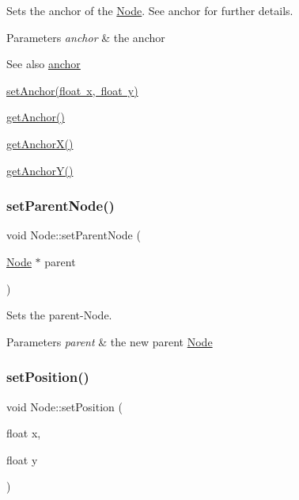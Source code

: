 Sets the anchor of the \mbox{\hyperlink{classsage_1_1Node}{Node}}. See anchor for further details. 


\begin{DoxyParams}{Parameters}
{\em anchor} & the anchor \\
\hline
\end{DoxyParams}
\begin{DoxySeeAlso}{See also}
\mbox{\hyperlink{classsage_1_1Node_a0956f07efec6dcbd3cf796a9028b9175}{anchor}} 

\mbox{\hyperlink{classsage_1_1Node_a8813a645a74f6ab59b25d434e65035c6}{set\+Anchor(float x, float y)}} 

\mbox{\hyperlink{classsage_1_1Node_a6733949b7b281d78a8bef8beafe1b630}{get\+Anchor()}} 

\mbox{\hyperlink{classsage_1_1Node_aa5f31c33d60b32b618d3beaf4e5c6c51}{get\+Anchor\+X()}} 

\mbox{\hyperlink{classsage_1_1Node_a78c5f86d0081854603178fb52d8c0a9b}{get\+Anchor\+Y()}} 
\end{DoxySeeAlso}
\mbox{\label{classsage_1_1Node_ad916f8953f6b38ef3514a37f75f9c20d}} 
\subsubsection{\texorpdfstring{setParentNode()}{setParentNode()}}
{\footnotesize\ttfamily void Node\+::set\+Parent\+Node (\begin{DoxyParamCaption}\item[{\mbox{\hyperlink{classsage_1_1Node}{Node}} $\ast$}]{parent }\end{DoxyParamCaption})\hspace{0.3cm}{\ttfamily [protected]}}



Sets the parent-\/\+Node. 


\begin{DoxyParams}{Parameters}
{\em parent} & the new parent \mbox{\hyperlink{classsage_1_1Node}{Node}} \\
\hline
\end{DoxyParams}
\mbox{\label{classsage_1_1Node_aaa8545c103ef1b35e5076dbedab93af5}} 
\subsubsection{\texorpdfstring{setPosition()}{setPosition()}\hspace{0.1cm}{\footnotesize\ttfamily [1/2]}}
{\footnotesize\ttfamily void Node\+::set\+Position (\begin{DoxyParamCaption}\item[{float}]{x,  }\item[{float}]{y }\end{DoxyParamCaption})}



